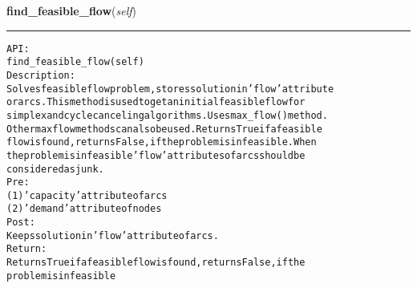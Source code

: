     \label{coinor:gimpy:graph:Graph:find_feasible_flow}

    \vspace{0.5ex}

\hspace{.8\funcindent}\begin{boxedminipage}{\funcwidth}

    \raggedright \textbf{find\_feasible\_flow}(\textit{self})

    \vspace{-1.5ex}

    \rule{\textwidth}{0.5\fboxrule}
\setlength{\parskip}{2ex}
\begin{alltt}

API:
    find\_feasible\_flow(self)
Description:
    Solves feasible flow problem, stores solution in 'flow' attribute
    or arcs. This method is used to get an initial feasible flow for
    simplex and cycle canceling algorithms. Uses max\_flow() method.
    Other max flow methods can also be used. Returns True if a feasible
    flow is found, returns False, if the problem is infeasible. When
    the problem is infeasible 'flow' attributes of arcs should be
    considered as junk.
Pre:
    (1) 'capacity' attribute of arcs
    (2) 'demand' attribute of nodes
Post:
    Keeps solution in 'flow' attribute of arcs.
Return:
    Returns True if a feasible flow is found, returns False, if the
    problem is infeasible
\end{alltt}

\setlength{\parskip}{1ex}
    \end{boxedminipage}

    \label{coinor:gimpy:graph:Graph:floyd_warshall}

    \vspace{0.5ex}

